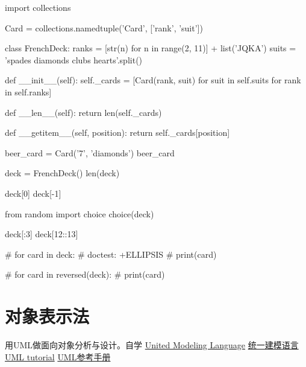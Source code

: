 \begin{python}
\begin{python}
import collections

Card = collections.namedtuple('Card', ['rank', 'suit'])

class FrenchDeck:
    ranks = [str(n) for n in range(2, 11)] + list('JQKA')
    suits = 'spades diamonds clubs hearts'.split()

    def __init__(self):
        self._cards = [Card(rank, suit) for suit in self.suits
                                        for rank in self.ranks]

    def __len__(self):
        return len(self._cards)

    def __getitem__(self, position):
        return self._cards[position]

beer_card = Card('7', 'diamonds')
beer_card

deck = FrenchDeck()
len(deck)

deck[0]
deck[-1]

from random import choice 
choice(deck)

deck[:3]
deck[12::13]

# for card in deck:  #  doctest: +ELLIPSIS
#     print(card)

# for card in reversed(deck):
#     print(card)
\end{python}


\section{对象表示法}
用UML做面向对象分析与设计。自学
\href{https://en.wikipedia.org/wiki/Unified_Modeling_Language}{United Modeling Language}
\href{http://www.uml.org/what-is-uml.htm}{统一建模语言}
\href{https://www.w3cschool.cn/uml_tutorial}{UML tutorial}
\href{file:./misc/UML_Tutorial.pdf}{UML参考手册}




\end{python}
